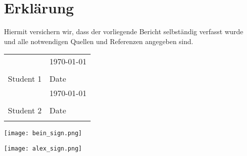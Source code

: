 \section*{Erklärung}

Hiermit versichern wir, dass der vorliegende Bericht selbständig verfasst wurde und alle notwendigen Quellen und Referenzen angegeben sind.

\begin{tabular}{@{}p{2.5in}p{2.5in}@{}}
	\\[5\bigskipamount]
	& \hspace{2mm}\today \\[-15pt]
	\dotfill & \dotfill \\
	Student 1 & Date \\[5\bigskipamount]
	& \hspace{2mm}\today \\[-15pt]
	\dotfill & \dotfill \\
	Student 2 & Date \\
	\centering
\end{tabular} 

\begin{minipage}{0.8\textwidth}
	\vspace{-12.75cm}
	\texttt{[image: bein\_sign.png]}
\end{minipage}

\begin{minipage}{0.3\textwidth}
	\vspace{-6.75cm}
	\texttt{[image: alex\_sign.png]}
\end{minipage}